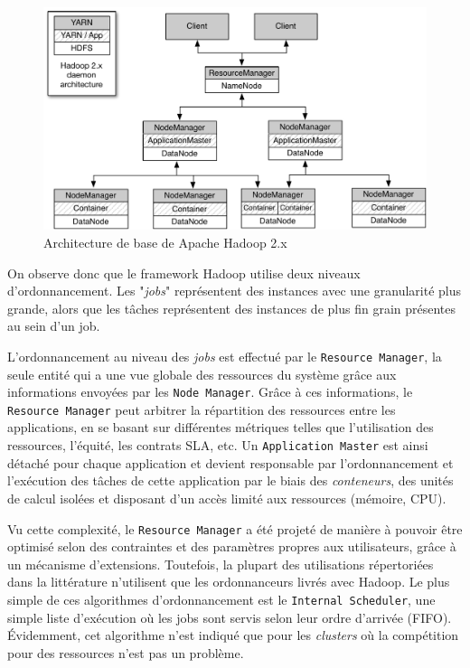 \begin{figure}[!ht]
	\centering
	\includegraphics[width=0.85\linewidth]{img/HadoopArch.pdf}
	\caption{Architecture de base de Apache Hadoop 2.x}
	\label{fig:ArquiteturaHadoop}
\end{figure}


On observe donc que le framework Hadoop utilise deux niveaux d'ordonnancement. Les "\textit{jobs}" représentent des instances avec une granularité plus grande, alors que les tâches représentent des instances de plus fin grain présentes au sein d'un job. 

L'ordonnancement au niveau des \textit{jobs} est effectué par le \texttt{Resource Manager}, la seule entité qui a une vue globale des ressources du système grâce aux informations envoyées par les \texttt{Node Manager}. Grâce à ces informations, le \texttt{Resource Manager} peut arbitrer la répartition des ressources entre les applications, en se basant sur différentes métriques telles que l'utilisation des ressources, l'équité, les contrats SLA, etc. Un \texttt{Application Master} est ainsi détaché pour chaque application et devient responsable par l'ordonnancement et l'exécution des tâches de cette application par le biais des \textit{conteneurs}, des unités de calcul isolées et disposant d'un accès limité aux ressources (mémoire, CPU). 

Vu cette complexité, le \texttt{Resource Manager} a été projeté de manière à pouvoir être optimisé selon des contraintes et des paramètres propres aux utilisateurs, grâce à un mécanisme d'extensions. Toutefois, la plupart des utilisations répertoriées dans la littérature n'utilisent que les ordonnanceurs livrés avec Hadoop. Le plus simple de ces algorithmes d'ordonnancement est le \texttt{Internal Scheduler}, une simple liste d'exécution où les jobs sont servis selon leur ordre d'arrivée (FIFO). Évidemment, cet algorithme n'est indiqué que pour les \textit{clusters} où la compétition pour des ressources n'est pas un problème. 

